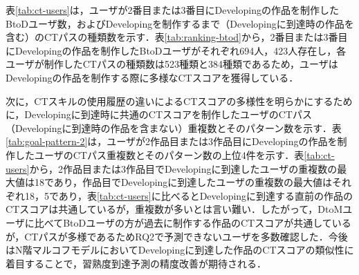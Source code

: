\documentclass[submit]{ipsj}
\begin{document}
\begin{table}[t]
  \caption{2作品目または3作品目にDevelopingの作品を制作したユーザのCTパス重複数とそのパターン数}
  \label{tab:goal-pattern-2}
  \centering
   \vspace{-2mm}
\end{table}

表\ref{tab:ct-users}は，ユーザが2番目または3番目にDevelopingの作品を制作したBtoDユーザ数，およびDevelopingを制作するまで（Developingに到達時の作品を含む）のCTパスの種類数を示す．表\ref{tab:ranking-btod}から，2番目または3番目にDevelopingの作品を制作したBtoDユーザがそれぞれ694人，423人存在し，各ユーザが制作したCTパスの種類数は523種類と384種類であるため，ユーザはDevelopingの作品を制作する際に多様なCTスコアを獲得している．

次に，CTスキルの使用履歴の違いによるCTスコアの多様性を明らかにするために，Developingに到達時に共通のCTスコアを制作したユーザのCTパス（Developingに到達時の作品を含まない）重複数とそのパターン数を示す．表\ref{tab:goal-pattern-2}は，ユーザが2作品目または3作品目にDevelopingの作品を制作したユーザのCTパス重複数とそのパターン数の上位4件を示す．表\ref{tab:ct-users}から，2作品目または3作品目でDevelopingに到達したユーザの重複数の最大値は18であり，作品目でDevelopingに到達したユーザの重複数の最大値はそれぞれ18，5であり，表\ref{tab:ct-users}に比べるとDevelopingに到達する直前の作品のCTスコアは共通しているが，重複数が多いとは言い難い．したがって，DtoMユーザに比べてBtoDユーザの方が過去に制作する作品のCTスコアが共通しているが，CTパスが多様であるためRQ2で予測できないユーザを多数確認した．今後はN階マルコフモデルにおいてDevelopingに到達した作品のCTスコアの類似性に着目することで，習熟度到達予測の精度改善が期待される．
\end{document}
